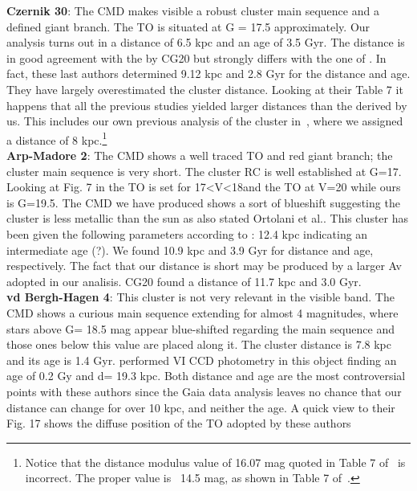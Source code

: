 \documentclass[draft]{aa}
\begin{document}
\textbf{Czernik 30}: The CMD makes visible a robust cluster main sequence
and a defined giant branch. The TO is situated at G = 17.5 approximately. Our
analysis turns out in a distance of 6.5 kpc and an age of 3.5 Gyr. The distance
is in good agreement with the by CG20 but strongly differs with the one
of \cite{Hayes_2015}. In fact, these last authors determined 9.12 kpc and 2.8
Gyr for the distance and age. They have largely overestimated the
cluster distance. Looking at their Table 7 it happens that all
the previous studies yielded larger distances than the derived by us. This includes
our own previous analysis of the cluster
in~\cite{Perren_2015}, where we assigned a distance of 8 kpc.\footnote{Notice
that the distance modulus value of 16.07 mag quoted in Table 7
of~\cite{Hayes_2015} is incorrect. The proper value is ~14.5 mag, as shown in
Table 7 of~\cite{Perren_2015}.} \\

\textbf{Arp-Madore 2}: The CMD shows a well traced TO and red giant branch; the cluster
main sequence is very short. The cluster RC is well established at G=17.
Looking at Fig. 7 in \cite{Ortolani_1995} the TO is
set for 17<V<18and the TO at V=20 while ours is G=19.5. The CMD we have
produced shows a sort of blueshift suggesting the cluster is less metallic
than the sun as also stated Ortolani et al.. This cluster has been given the
following parameters according to \cite{Ortolani_1995}: 12.4 kpc indicating an
intermediate age (?).  We found 10.9 kpc and 3.9 Gyr  for distance and age, 
respectively. The fact that
our distance is short may be produced by a larger Av adopted in our
analisis. CG20 found a distance of 11.7 kpc and 3.0 Gyr.\\

\textbf{vd Bergh-Hagen 4}: This cluster is not very relevant in the visible
band. The CMD shows a curious main sequence extending for almost 4 magnitudes,
where stars above G= 18.5 mag appear blue-shifted regarding the main sequence
and those ones below this value are placed along it. The cluster
distance is 7.8 kpc and its age is 1.4 Gyr. \cite{Carraro_2007}
performed VI CCD photometry in this object finding an
age of 0.2 Gy and d= 19.3 kpc. Both distance and age are the most
controversial points with these authors since the Gaia data analysis leaves no
chance that our distance can change for over 10 kpc, and neither the age. A
quick view to their Fig. 17 shows the diffuse position of the TO adopted by
these authors\\
\end{document}

